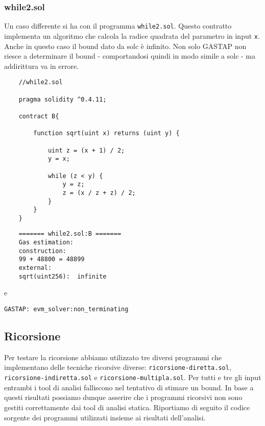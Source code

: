     \subsubsection{while2.sol}
    
    Un caso differente si ha con il programma \verb|while2.sol|.
    Questo contratto implementa un algoritmo che calcola la radice quadrata del parametro in input \verb|x|. Anche in questo caso il bound dato da solc è infinito. Non solo GASTAP non riesce a determinare il bound - comportandosi quindi in modo simile a solc - ma addirittura va in errore.
    
    \begin{minipage}{\linewidth}
    \begin{lstlisting}
    //while2.sol

    pragma solidity ^0.4.11;

    contract B{

        function sqrt(uint x) returns (uint y) {
        
            uint z = (x + 1) / 2;
            y = x;
            
            while (z < y) {
                y = z;
                z = (x / z + z) / 2;
            }
        }
    }
    \end{lstlisting}
    \end{minipage}
    

    \begin{minipage}{\linewidth}
    \begin{lstlisting}
    ======= while2.sol:B =======
    Gas estimation:
    construction:
    99 + 48800 = 48899
    external:
    sqrt(uint256):	infinite
    \end{lstlisting}
    \end{minipage}

    
    e
    
    \verb|GASTAP: evm_solver:non_terminating|

    \newpage

    \subsection{Ricorsione}
    
    Per testare la ricorsione abbiamo utilizzato tre diversi programmi che implementano delle tecniche ricorsive diverse:
    \verb|ricorsione-diretta.sol|, \verb|ricorsione-indiretta.sol| e \verb|ricorsione-multipla.sol|. Per tutti e tre gli input entrambi i tool di analisi falliscono nel tentativo di stimare un bound. In base a questi risultati possiamo dunque asserire che i programmi ricorsivi non sono gestiti correttamente dai tool di analisi statica.\newline
    \indent Riportiamo di seguito il codice sorgente dei programmi utilizzati insieme ai risultati dell'analisi.\newline

